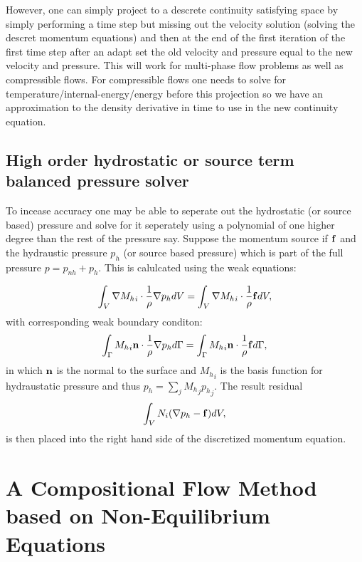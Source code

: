 However, one can simply project to a descrete continuity satisfying space by
simply performing a time step but missing out the velocity solution (solving the
descret momentum equations) and then at the end of the first iteration of the first time step
after an adapt set the old velocity and pressure equal to the new velocity and pressure.
This will work for multi-phase flow problems as well as compressible flows. For compressible
flows one needs to solve for temperature/internal-energy/energy before
this projection so we have an approximation to the density derivative in time to use in
the new continuity equation.


\subsection{High order hydrostatic or source term balanced pressure solver}

To incease accuracy one may be able to seperate out the hydrostatic (or source based)
pressure and solve for it seperately using a polynomial of one higher degree than the rest of the pressure say.
Suppose the momentum source if ${\bf f}$ and the hydraustic
pressure $p_h$ (or source based pressure) which is part of the full pressure $p=p_{nh} + p_h$.
This is calulcated using the weak equations:

\begin{equation}
\int_V \nabla {M_h}_i \cdot \frac{1}{\rho} \nabla p_h dV =  \int_V \nabla {M_h}_i \cdot \frac{1}{\rho} {\bf f} dV,
\end{equation}
with corresponding weak boundary conditon:
\begin{equation}
 \int_{\Gamma} {M_h}_i {\bf n}\cdot\frac{1}{\rho} \nabla p_h d\Gamma = \int_{\Gamma} {M_h}_i {\bf n}\cdot \frac{1}{\rho}{\bf f} d\Gamma,
\end{equation}
in which ${\bf n}$ is the normal to the surface and ${M_h}_i$ is the basis function for hydraustatic pressure
and thus $p_h =\sum_j {M_h}_j {p_h}_j$.
The result residual
\begin{equation}
\int_V {N}_i ( \nabla p_h - {\bf f} ) dV,
\end{equation}
is then placed into the right hand side of the discretized momentum equation.






\pagebreak


\section{A Compositional Flow
Method based on Non-Equilibrium
Equations}
\label{Compositional}

